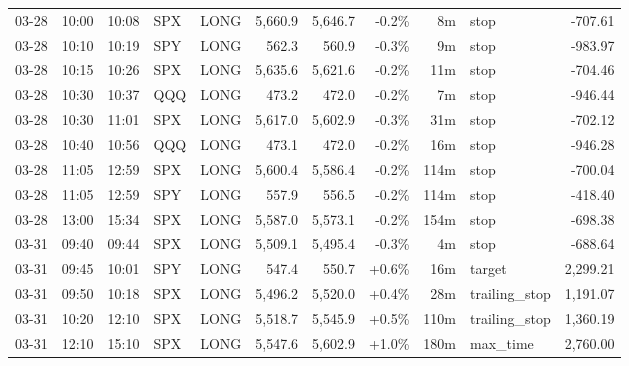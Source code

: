 \documentclass[11pt,a4paper,twoside]{article}
\begin{document}
\begin{center}
\begin{longtable}{>{\color{txtmain}}l l l l l r r r r >{\color{txtmain}}l r}
03-28 & 10:00 & 10:08 & SPX & LONG & 5,660.9 & 5,646.7 & \textcolor{lossred}{-0.2\%} & 8m & stop & \textcolor{lossred}{-707.61} \\
03-28 & 10:10 & 10:19 & SPY & LONG & 562.3 & 560.9 & \textcolor{lossred}{-0.3\%} & 9m & stop & \textcolor{lossred}{-983.97} \\
03-28 & 10:15 & 10:26 & SPX & LONG & 5,635.6 & 5,621.6 & \textcolor{lossred}{-0.2\%} & 11m & stop & \textcolor{lossred}{-704.46} \\
03-28 & 10:30 & 10:37 & QQQ & LONG & 473.2 & 472.0 & \textcolor{lossred}{-0.2\%} & 7m & stop & \textcolor{lossred}{-946.44} \\
03-28 & 10:30 & 11:01 & SPX & LONG & 5,617.0 & 5,602.9 & \textcolor{lossred}{-0.3\%} & 31m & stop & \textcolor{lossred}{-702.12} \\
03-28 & 10:40 & 10:56 & QQQ & LONG & 473.1 & 472.0 & \textcolor{lossred}{-0.2\%} & 16m & stop & \textcolor{lossred}{-946.28} \\
03-28 & 11:05 & 12:59 & SPX & LONG & 5,600.4 & 5,586.4 & \textcolor{lossred}{-0.2\%} & 114m & stop & \textcolor{lossred}{-700.04} \\
03-28 & 11:05 & 12:59 & SPY & LONG & 557.9 & 556.5 & \textcolor{lossred}{-0.2\%} & 114m & stop & \textcolor{lossred}{-418.40} \\
03-28 & 13:00 & 15:34 & SPX & LONG & 5,587.0 & 5,573.1 & \textcolor{lossred}{-0.2\%} & 154m & stop & \textcolor{lossred}{-698.38} \\
03-31 & 09:40 & 09:44 & SPX & LONG & 5,509.1 & 5,495.4 & \textcolor{lossred}{-0.3\%} & 4m & stop & \textcolor{lossred}{-688.64} \\
03-31 & 09:45 & 10:01 & SPY & LONG & 547.4 & 550.7 & \textcolor{wingreen}{+0.6\%} & 16m & target & \textcolor{wingreen}{2,299.21} \\
03-31 & 09:50 & 10:18 & SPX & LONG & 5,496.2 & 5,520.0 & \textcolor{wingreen}{+0.4\%} & 28m & trailing\_stop & \textcolor{wingreen}{1,191.07} \\
03-31 & 10:20 & 12:10 & SPX & LONG & 5,518.7 & 5,545.9 & \textcolor{wingreen}{+0.5\%} & 110m & trailing\_stop & \textcolor{wingreen}{1,360.19} \\
03-31 & 12:10 & 15:10 & SPX & LONG & 5,547.6 & 5,602.9 & \textcolor{wingreen}{+1.0\%} & 180m & max\_time & \textcolor{wingreen}{2,760.00} \\
\end{longtable}
\end{center}
\clearpage
\end{document}

